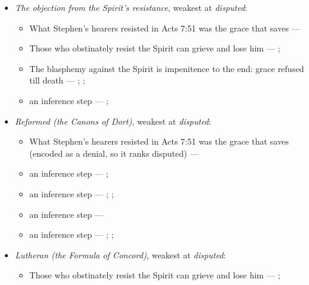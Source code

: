 \documentclass[11pt]{article}
\begin{document}
\begin{itemize}
\begin{itemize}
\end{itemize}
\item \emph{The objection from the Spirit’s resistance}, weakest at \emph{disputed}:
\begin{itemize}
\item What Stephen’s hearers resisted in Acts 7:51 was the grace that saves --- \cite[Five Arminian Articles (1610), art. 4]{schaff-creeds-christendom-3-1977}
\item Those who obstinately resist the Spirit can grieve and lose him --- \cite[Solid Declaration II.83]{concordia-triglotta-1921}; \cite[Solid Declaration XI.42]{concordia-triglotta-1921}
\item The blasphemy against the Spirit is impenitence to the end: grace refused till death --- \cite[325]{npnf1-06-1888}; \cite[II-II q.14 a.1]{aquinas-summa-1920}; \cite[74]{calvin-harmony-evangelists-2-1845}
\item an inference step --- \cite[325]{npnf1-06-1888}; \cite[On Rebuke and Grace, ch. 43]{npnf1-05-1887}
\end{itemize}
\item \emph{Reformed (the Canons of Dort)}, weakest at \emph{disputed}:
\begin{itemize}
\item What Stephen’s hearers resisted in Acts 7:51 was the grace that saves (encoded as a denial, so it ranks disputed) --- \cite[Canons of Dort, III/IV, art. 9]{schaff-creeds-christendom-3-1977}
\item an inference step --- \cite[ad loc. Eph 2:8]{robertson-word-pictures-4-1931}; \cite[228--229]{calvin-galatians-ephesians-1854}
\item an inference step --- \cite[600]{arminius-works-1-1825}; \cite[681]{arminius-works-1-1825}; \cite[Five Arminian Articles (1610), art. 4]{schaff-creeds-christendom-3-1977}
\item an inference step --- \cite[527--565]{arminius-works-3-1853}
\item an inference step --- \cite[Solid Declaration II.89]{concordia-triglotta-1921}; \cite[Solid Declaration II.60]{concordia-triglotta-1921}; \cite[Solid Declaration XI.41]{concordia-triglotta-1921}
\end{itemize}
\item \emph{Lutheran (the Formula of Concord)}, weakest at \emph{disputed}:
\begin{itemize}
\item Those who obstinately resist the Spirit can grieve and lose him --- \cite[Solid Declaration II.83]{concordia-triglotta-1921}; \cite[Solid Declaration XI.42]{concordia-triglotta-1921}

\end{itemize}
\end{itemize}
\end{document}
